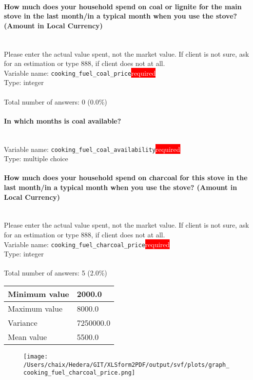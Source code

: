 \documentclass[11.5pt, a4paper]{scrartcl}
\begin{document}
\paragraph{How much does your household spend on coal or lignite for the main stove in the last month/in a typical month when you use the stove? (Amount in Local Currency) }
\ \\ {\small Please enter the actual value spent, not the market value. If client is not sure, ask for an estimation or type 888, if client does not at all. }
\  \\Variable name: \texttt{cooking\_fuel\_coal\_price}\hfill\colorbox{red}{\small{\textcolor{white}{required}}}\\
 Type: integer\\
\\Total number of answers: 0 (0.0\%)
\\[0.2em]\paragraph{In which months is coal available?}
\  \\Variable name: \texttt{cooking\_fuel\_coal\_availability}\hfill\colorbox{red}{\small{\textcolor{white}{required}}}\\
 Type: multiple choice\\
\paragraph{How much  does your household spend on charcoal for this stove in the last month/in a typical month when you use the stove? (Amount in Local Currency) }
\ \\ {\small Please enter the actual value spent, not the market value. If client is not sure, ask for an estimation or type 888, if client does not at all. }
\  \\Variable name: \texttt{cooking\_fuel\_charcoal\_price}\hfill\colorbox{red}{\small{\textcolor{white}{required}}}\\
 Type: integer\\
\\Total number of answers: 5 (2.0\%)
\\[0.2em] \begin{tabular}{p{4cm}|p{8cm}}
Minimum value &2000.0 \\
\hline
\cellcolor{mygray} Maximum value & \cellcolor{mygray}8000.0 \\
\hline
Variance &7250000.0 \\
\hline
\cellcolor{mygray} Mean value & \cellcolor{mygray}5500.0 \\
\hline
\end{tabular}
\begin{figure}[H]
\centering
\texttt{[image: /Users/chaix/Hedera/GIT/XLSform2PDF/output/svf/plots/graph\_cooking\_fuel\_charcoal\_price.png]}
\end{figure}
\end{document}
